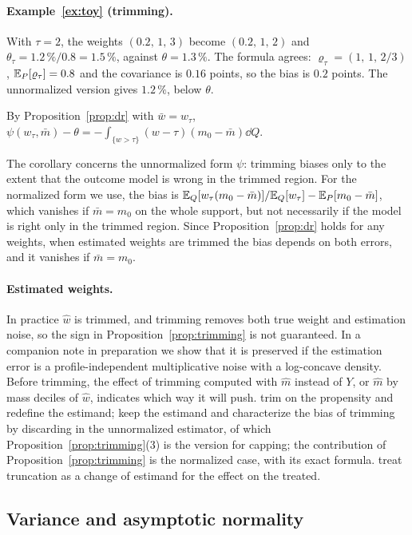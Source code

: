 \paragraph{Example~\ref{ex:toy} (trimming).} With $\tau=2$, the weights $(0.2,\,1,\,3)$ become $(0.2,\,1,\,2)$ and $\theta_\tau=1.2\,\%/0.8=1.5\,\%$, against $\theta=1.3\,\%$. The formula agrees: $\varrho_\tau=(1,\,1,\,2/3)$, $\mathbb{E}_P[\varrho_\tau]=0.8$ and the covariance is $0.16$ points, so the bias is $0.2$ points. The unnormalized version gives $1.2\,\%$, below $\theta$.

\begin{corollary}\label{cor:drtrimming}
By Proposition~\ref{prop:dr} with $\bar w=w_\tau$, $\psi(w_\tau,\bar m)-\theta=-\int_{\{w>\tau\}}(w-\tau)(m_0-\bar m)\dd Q$.
\end{corollary}
The corollary concerns the unnormalized form $\psi$: trimming biases only to the extent that the outcome model is wrong in the trimmed region. For the normalized form we use, the bias is $\mathbb{E}_Q[w_\tau(m_0-\bar m)]/\mathbb{E}_Q[w_\tau]-\mathbb{E}_P[m_0-\bar m]$, which vanishes if $\bar m=m_0$ on the whole support, but not necessarily if the model is right only in the trimmed region. Since Proposition~\ref{prop:dr} holds for any weights, when estimated weights are trimmed the bias depends on both errors, and it vanishes if $\bar m=m_0$.

\paragraph{Estimated weights.} In practice $\hat w$ is trimmed, and trimming removes both true weight and estimation noise, so the sign in Proposition~\ref{prop:trimming} is not guaranteed. In a companion note in preparation we show that it is preserved if the estimation error is a profile-independent multiplicative noise with a log-concave density. Before trimming, the effect of trimming computed with $\hat m$ instead of $Y$, or $\hat m$ by mass deciles of $\hat w$, indicates which way it will push. \citet{crump2009} trim on the propensity and redefine the estimand; \citet{ma2020} keep the estimand and characterize the bias of trimming by discarding in the unnormalized estimator, of which Proposition~\ref{prop:trimming}(3) is the version for capping; the contribution of Proposition~\ref{prop:trimming} is the normalized case, with its exact formula. \citet{liu2023} treat truncation as a change of estimand for the effect on the treated.

\subsection{Variance and asymptotic normality}

